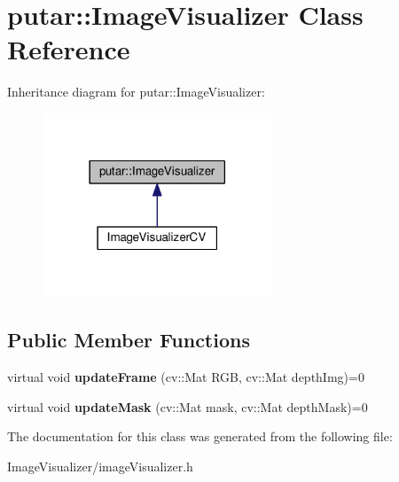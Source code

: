 \hypertarget{classputar_1_1ImageVisualizer}{}\section{putar\+:\+:Image\+Visualizer Class Reference}
\label{classputar_1_1ImageVisualizer}


Inheritance diagram for putar\+:\+:Image\+Visualizer\+:
\nopagebreak
\begin{figure}[H]
\begin{center}
\leavevmode
\includegraphics[width=194pt]{classputar_1_1ImageVisualizer__inherit__graph}
\end{center}
\end{figure}
\subsection*{Public Member Functions}
\begin{DoxyCompactItemize}
\item 
virtual void {\bfseries update\+Frame} (cv\+::\+Mat R\+GB, cv\+::\+Mat depth\+Img)=0\hypertarget{classputar_1_1ImageVisualizer_add122b9e49a597c121f480f57e1cb679}{}\label{classputar_1_1ImageVisualizer_add122b9e49a597c121f480f57e1cb679}

\item 
virtual void {\bfseries update\+Mask} (cv\+::\+Mat mask, cv\+::\+Mat depth\+Mask)=0\hypertarget{classputar_1_1ImageVisualizer_a2425a96f33553a34bf7c2640fff32c02}{}\label{classputar_1_1ImageVisualizer_a2425a96f33553a34bf7c2640fff32c02}

\end{DoxyCompactItemize}


The documentation for this class was generated from the following file\+:\begin{DoxyCompactItemize}
\item 
Image\+Visualizer/image\+Visualizer.\+h\end{DoxyCompactItemize}
